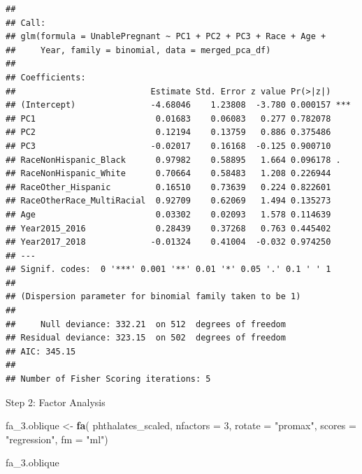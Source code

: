 \documentclass[
]{article}
\newenvironment{Shaded}{\begin{snugshade}}{\end{snugshade}}
\newcommand{\AttributeTok}[1]{\textcolor[rgb]{0.13,0.29,0.53}{#1}}
\newcommand{\DecValTok}[1]{\textcolor[rgb]{0.00,0.00,0.81}{#1}}
\newcommand{\FunctionTok}[1]{\textcolor[rgb]{0.13,0.29,0.53}{\textbf{#1}}}
\newcommand{\NormalTok}[1]{#1}
\newcommand{\OtherTok}[1]{\textcolor[rgb]{0.56,0.35,0.01}{#1}}
\newcommand{\StringTok}[1]{\textcolor[rgb]{0.31,0.60,0.02}{#1}}
\begin{document}
\begin{verbatim}
## 
## Call:
## glm(formula = UnablePregnant ~ PC1 + PC2 + PC3 + Race + Age + 
##     Year, family = binomial, data = merged_pca_df)
## 
## Coefficients:
##                           Estimate Std. Error z value Pr(>|z|)    
## (Intercept)               -4.68046    1.23808  -3.780 0.000157 ***
## PC1                        0.01683    0.06083   0.277 0.782078    
## PC2                        0.12194    0.13759   0.886 0.375486    
## PC3                       -0.02017    0.16168  -0.125 0.900710    
## RaceNonHispanic_Black      0.97982    0.58895   1.664 0.096178 .  
## RaceNonHispanic_White      0.70664    0.58483   1.208 0.226944    
## RaceOther_Hispanic         0.16510    0.73639   0.224 0.822601    
## RaceOtherRace_MultiRacial  0.92709    0.62069   1.494 0.135273    
## Age                        0.03302    0.02093   1.578 0.114639    
## Year2015_2016              0.28439    0.37268   0.763 0.445402    
## Year2017_2018             -0.01324    0.41004  -0.032 0.974250    
## ---
## Signif. codes:  0 '***' 0.001 '**' 0.01 '*' 0.05 '.' 0.1 ' ' 1
## 
## (Dispersion parameter for binomial family taken to be 1)
## 
##     Null deviance: 332.21  on 512  degrees of freedom
## Residual deviance: 323.15  on 502  degrees of freedom
## AIC: 345.15
## 
## Number of Fisher Scoring iterations: 5
\end{verbatim}

Step 2: Factor Analysis

\begin{Shaded}
\begin{Highlighting}[]
\NormalTok{fa\_3.oblique }\OtherTok{\textless{}{-}} \FunctionTok{fa}\NormalTok{(}
\NormalTok{  phthalates\_scaled,}
  \AttributeTok{nfactors =} \DecValTok{3}\NormalTok{,}
  \AttributeTok{rotate =} \StringTok{"promax"}\NormalTok{,}
  \AttributeTok{scores =} \StringTok{"regression"}\NormalTok{,}
  \AttributeTok{fm =} \StringTok{"ml"}\NormalTok{)}

\NormalTok{fa\_3.oblique}
\end{Highlighting}
\end{Shaded}
\end{document}

